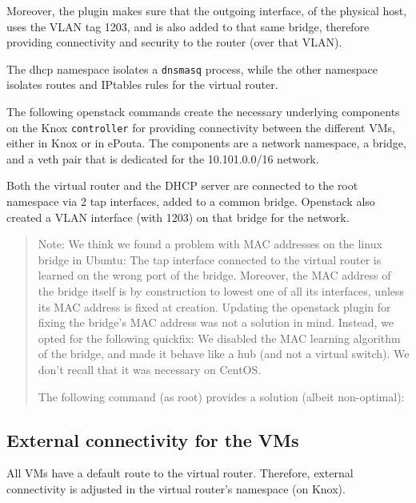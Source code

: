 Moreover, the plugin makes sure that the outgoing interface, of the
physical host, uses the VLAN tag 1203, and is also added to that same
bridge, therefore providing connectivity and security to the router
(over that VLAN).

The dhcp namespace isolates a \texttt{dnsmasq} process, while the
other
namespace isolates routes and IPtables rules for the virtual router.


The following openstack commands create the necessary underlying
components on the Knox \texttt{controller} for providing connectivity
between the different VMs, either in Knox or in ePouta. The components
are a network namespace, a bridge, and a veth pair that is dedicated
for the 10.101.0.0/16 network.


Both the virtual router and the DHCP server are connected to the root
namespace via 2 tap interfaces, added to a common bridge. Openstack
also created a VLAN interface (with 1203) on that bridge for the
 network.


\begin{quote}
  Note: We think we found a problem with MAC addresses on the linux
  bridge in Ubuntu: The tap interface connected to the virtual router
  is learned on the wrong port of the bridge. Moreover, the MAC
  address of the bridge itself is by construction to lowest one of all
  its interfaces, unless its MAC address is fixed at
  creation. Updating the openstack plugin for fixing the bridge's MAC
  address was not a solution in mind. Instead, we opted for the
  following quickfix: We disabled the MAC learning algorithm of the
  bridge, and made it behave like a hub (and not a virtual switch). We
  don't recall that it was necessary on CentOS.

  The following command (as root) provides a solution (albeit
  non-optimal):

\end{quote}

\subsection{External connectivity for the VMs}
\label{section:external:connectivity}

All VMs have a default route to the virtual router. Therefore,
external connectivity is adjusted in the virtual router's namespace
(on Knox).

